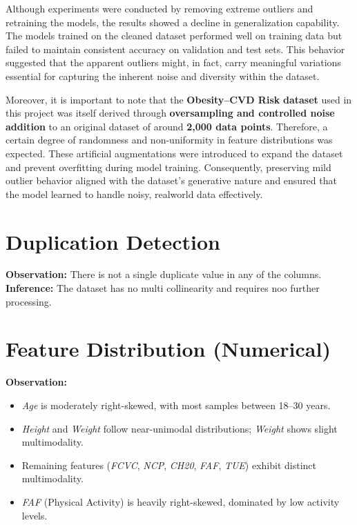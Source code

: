 Although experiments were conducted by removing extreme outliers and retraining the models, the results showed a decline in generalization capability.
The models trained on the cleaned dataset performed well on training data but failed to maintain consistent accuracy on validation and test sets.
This behavior suggested that the apparent outliers might, in fact, carry meaningful variations essential for capturing the inherent noise and diversity within the dataset.

Moreover, it is important to note that the \textbf{Obesity–CVD Risk} \textbf{dataset} used in this project was itself derived through \textbf{oversampling and controlled noise addition} to an original dataset of around \textbf{2,000 data points}.
Therefore, a certain degree of randomness and non-uniformity in feature distributions was expected.
These artificial augmentations were introduced to expand the dataset and prevent overfitting during model training.
Consequently, preserving mild outlier behavior aligned with the dataset’s generative nature and ensured that the model learned to handle noisy, realworld data effectively.



\section{Duplication Detection}\label{sec:duplication-detection}
\textbf{Observation:} There is not a single duplicate value in any of the columns.\\
\textbf{Inference:} The dataset has no multi collinearity and requires noo further processing.



\section{Feature Distribution (Numerical)}\label{sec:feature-distribution-numerical}

\textbf{Observation:}
\begin{itemize}
    \item \textit{Age} is moderately right-skewed, with most samples between 18–30 years.
    \item \textit{Height} and \textit{Weight} follow near-unimodal distributions; \textit{Weight} shows slight multimodality.
    \item Remaining features (\textit{FCVC}, \textit{NCP}, \textit{CH20}, \textit{FAF}, \textit{TUE}) exhibit distinct multimodality.
    \item \textit{FAF} (Physical Activity) is heavily right-skewed, dominated by low activity levels.
\end{itemize}

